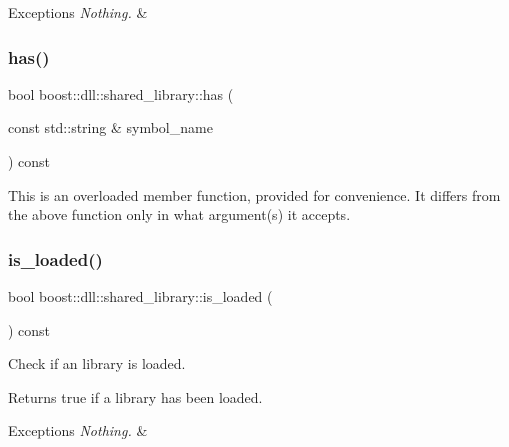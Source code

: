 \begin{DoxyExceptions}{Exceptions}
{\em Nothing.} & \\
\hline
\end{DoxyExceptions}
\mbox{\label{a01708_a7f33a8cd84bf689a73ddeed81013bd79}} 
\subsubsection{\texorpdfstring{has()}{has()}\hspace{0.1cm}{\footnotesize\ttfamily [2/2]}}
{\footnotesize\ttfamily bool boost\+::dll\+::shared\+\_\+library\+::has (\begin{DoxyParamCaption}\item[{const std\+::string \&}]{symbol\+\_\+name }\end{DoxyParamCaption}) const\hspace{0.3cm}{\ttfamily [inline]}}

This is an overloaded member function, provided for convenience. It differs from the above function only in what argument(s) it accepts. \mbox{\label{a01708_a31ec32c213665bd151f2c615f89f94ef}} 
\subsubsection{\texorpdfstring{is\+\_\+loaded()}{is\_loaded()}}
{\footnotesize\ttfamily bool boost\+::dll\+::shared\+\_\+library\+::is\+\_\+loaded (\begin{DoxyParamCaption}{ }\end{DoxyParamCaption}) const\hspace{0.3cm}{\ttfamily [inline]}}

Check if an library is loaded.

\begin{DoxyReturn}{Returns}
true if a library has been loaded. 
\end{DoxyReturn}

\begin{DoxyExceptions}{Exceptions}
{\em Nothing.} & \\
\hline
\end{DoxyExceptions}
\mbox{\label{a01708_ae7df87e5b40963d6348a5962d9561f2e}} 
